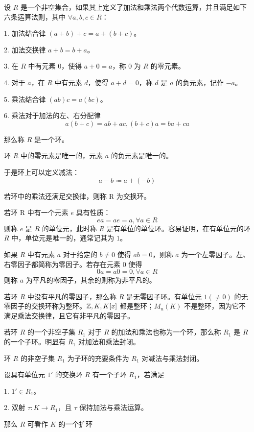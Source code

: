 \begin{definition}
    设 $R$ 是一个非空集合，如果其上定义了加法和乘法两个代数运算，并且满足如下六条运算法则，其中 $\forall a,b,c\in R$：

    1. 加法结合律 $(a+b)+c = a+(b+c)$。

    2. 加法交换律 $a+b = b+a$。

    3. 在 $R$ 中有元素 $0$，使得 $a+0=a$，称 $0$ 为 $R$ 的零元素。

    4. 对于 $a$，在 $R$ 中有元素 $d$，使得 $a+d=0$，称 $d$ 是 $a$ 的负元素，记作 $-a$。

    5. 乘法结合律 $(ab)c = a(bc)$。

    6. 乘法对于加法的左、右分配律
    \[a(b+c) = ab+ac,(b+c)a = ba+ca\]

    那么称 $R$ 是一个环。
\end{definition}

\begin{theorem}
    环 $R$ 中的零元素是唯一的，元素 $a$ 的负元素是唯一的。
\end{theorem}

于是环上可以定义减法：
\[a-b \coloneqq  a + (-b)\]

若环中的乘法还满足交换律，则称 R 为交换环。

若环 R 中有一个元素 $e$ 具有性质：
\[ea = ae  = a, \forall a \in R\]
则称 $e$ 是 $R$ 的单位元，此时称 $R$ 是有单位的单位环。容易证明，在有单位元的环 $R$ 中，单位元是唯一的，通常记其为 $1$。

如果 $R$ 中有元素 $a$ 对于给定的 $b \ne 0$ 使得 $ab=0$，则称 $a$ 为一个左零因子。左、右零因子都简称为零因子。若存在元素 $0$ 使得
\[0a=a0=0, \forall a \in R\]
则称 $a$ 为平凡的零因子，其余的则称为非平凡的。

若环 $R$ 中没有平凡的零因子，那么称 $R$ 是无零因子环。有单位元 $1(\ne 0)$ 的无零因子的交换环称为整环。$\mathbb{Z},K,K[x]$ 都是整环；$M_n(K)$ 不是整环，因为它不满足乘法交换律，且它有非平凡的零因子。

若环 $R$ 的一个非空子集 $R_1$ 对于 $R$ 的加法和乘法也称为一个环，那么称 $R_1$ 是 $R$ 的一个子环。明显有 $R_1$ 对加法和乘法封闭。

\begin{theorem}
    环 $R$ 的非空子集 $R_1$ 为子环的充要条件为 $R_1$ 对减法与乘法封闭。
\end{theorem}

\begin{definition}
    设具有单位元 $1'$ 的交换环 $R$ 有一个子环 $R_1$，若满足

    1. $1' \in R_1$。

    2. 双射 $\tau : K \to R_1$，且 $\tau$ 保持加法与乘法运算。

    那么 $R$ 可看作 $K$ 的一个扩环
\end{definition}


